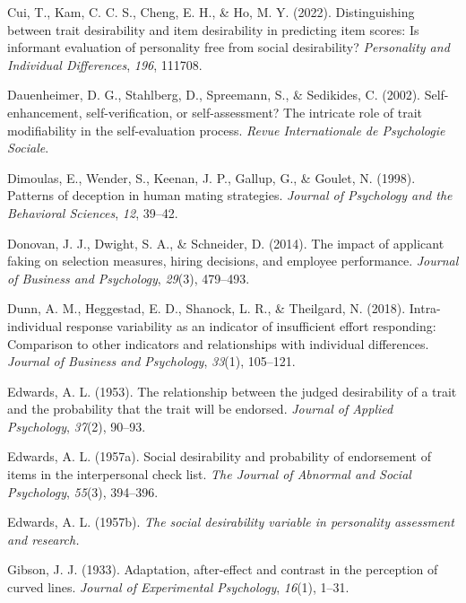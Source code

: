 \documentclass[
  ,jou]{apa6}
\newlength{\cslhangindent}
\newenvironment{CSLReferences}[2] %
 {\begin{list}{}{%
  \setlength{\itemindent}{0pt}
  \setlength{\leftmargin}{0pt}
  \setlength{\parsep}{0pt}
  \ifodd #1
   \setlength{\leftmargin}{\cslhangindent}
   \setlength{\itemindent}{-1\cslhangindent}
  \fi
  \setlength{\itemsep}{#2\baselineskip}}}
 {\end{list}}
\begin{document}
\begin{CSLReferences}{1}{0}
Cui, T., Kam, C. C. S., Cheng, E. H., \& Ho, M. Y. (2022). Distinguishing between trait desirability and item desirability in predicting item scores: Is informant evaluation of personality free from social desirability? \emph{Personality and Individual Differences}, \emph{196}, 111708.

Dauenheimer, D. G., Stahlberg, D., Spreemann, S., \& Sedikides, C. (2002). Self-enhancement, self-verification, or self-assessment? The intricate role of trait modifiability in the self-evaluation process. \emph{Revue Internationale de Psychologie Sociale}.

Dimoulas, E., Wender, S., Keenan, J. P., Gallup, G., \& Goulet, N. (1998). Patterns of deception in human mating strategies. \emph{Journal of Psychology and the Behavioral Sciences}, \emph{12}, 39--42.

Donovan, J. J., Dwight, S. A., \& Schneider, D. (2014). The impact of applicant faking on selection measures, hiring decisions, and employee performance. \emph{Journal of Business and Psychology}, \emph{29}(3), 479--493.

Dunn, A. M., Heggestad, E. D., Shanock, L. R., \& Theilgard, N. (2018). Intra-individual response variability as an indicator of insufficient effort responding: Comparison to other indicators and relationships with individual differences. \emph{Journal of Business and Psychology}, \emph{33}(1), 105--121.

Edwards, A. L. (1953). The relationship between the judged desirability of a trait and the probability that the trait will be endorsed. \emph{Journal of Applied Psychology}, \emph{37}(2), 90--93.

Edwards, A. L. (1957a). Social desirability and probability of endorsement of items in the interpersonal check list. \emph{The Journal of Abnormal and Social Psychology}, \emph{55}(3), 394--396.

Edwards, A. L. (1957b). \emph{The social desirability variable in personality assessment and research.}

Gibson, J. J. (1933). Adaptation, after-effect and contrast in the perception of curved lines. \emph{Journal of Experimental Psychology}, \emph{16}(1), 1--31.


\end{CSLReferences}
\end{document}
